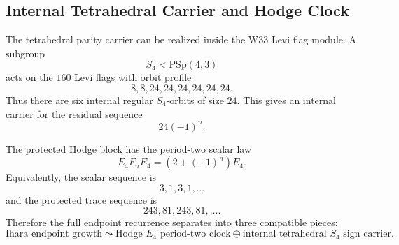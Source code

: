 \subsection{Internal Tetrahedral Carrier and Hodge Clock}
\label{subsec:bt646-internal-s4-hodge-clock}

The tetrahedral parity carrier can be realized inside the W33 Levi flag module.
A subgroup
\[
S_4<\mathrm{PSp}(4,3)
\]
acts on the \(160\) Levi flags with orbit profile
\[
\boxed{8,8,24,24,24,24,24,24.}
\]
Thus there are six internal regular \(S_4\)-orbits of size \(24\).  This gives
an internal carrier for the residual sequence
\[
\boxed{24(-1)^n.}
\]

The protected Hodge block has the period-two scalar law
\[
\boxed{E_4F_nE_4=(2+(-1)^n)E_4.}
\]
Equivalently, the scalar sequence is
\[
3,1,3,1,\ldots
\]
and the protected trace sequence is
\[
243,81,243,81,\ldots .
\]
Therefore the full endpoint recurrence separates into three compatible pieces:
\[
\boxed{
\text{Ihara endpoint growth}
\leadsto
\text{Hodge }E_4\text{ period-two clock}
\oplus
\text{internal tetrahedral }S_4\text{ sign carrier.}
}
\]
